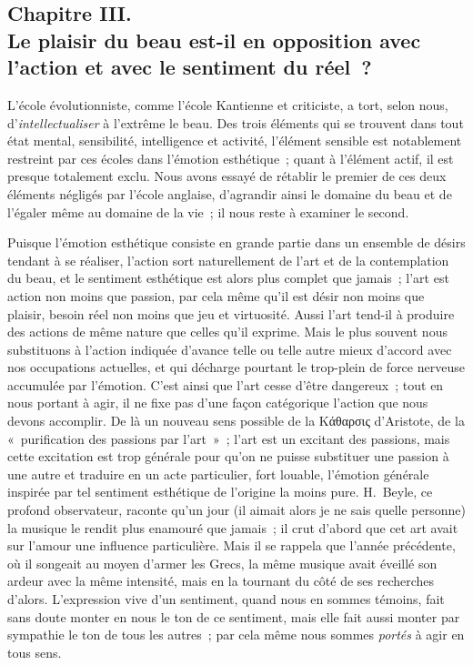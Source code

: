 \documentclass[french,twoside]{book} %
\begin{document}
\subsection[{Chapitre III. Le plaisir du beau est-il en opposition avec l’action et avec le sentiment du réel ?}]{Chapitre III. \\
Le plaisir du beau est-il en opposition avec l’action et avec le sentiment du réel ?}
\noindent  L’école évolutionniste, comme l’école Kantienne et criticiste, a tort, selon nous, d’\emph{intellectualiser} à l’extrême le beau. Des trois éléments qui se trouvent dans tout état mental, sensibilité, intelligence et activité, l’élément sensible est notablement restreint par ces écoles dans l’émotion esthétique ; quant à l’élément actif, il est presque totalement exclu. Nous avons essayé de rétablir le premier de ces deux éléments négligés par l’école anglaise, d’agrandir ainsi le domaine du beau et de l’égaler même au domaine de la vie ; il nous reste à examiner le second.\par
Puisque l’émotion esthétique consiste en grande partie dans un ensemble de désirs tendant à se réaliser, l’action sort naturellement de l’art et de la contemplation du beau, et le sentiment esthétique est alors plus complet que jamais ; l’art est action non moins que passion, par cela même qu’il est désir non moins que plaisir, besoin réel  non moins que jeu et virtuosité. Aussi l’art tend-il à produire des actions de même nature que celles qu’il exprime. Mais le plus souvent nous substituons à l’action indiquée d’avance telle ou telle autre mieux d’accord avec nos occupations actuelles, et qui décharge pourtant le trop-plein de force nerveuse accumulée par l’émotion. C’est ainsi que l’art cesse d’être dangereux ; tout en nous portant à agir, il ne fixe pas d’une façon catégorique l’action que nous devons accomplir. De là un nouveau sens possible de la Κάθαρσις d’Aristote, de la « purification des passions par l’art » ; l’art est un excitant des passions, mais cette excitation est trop générale pour qu’on ne puisse substituer une passion à une autre et traduire en un acte particulier, fort louable, l’émotion générale inspirée par tel sentiment esthétique de l’origine la moins pure. H. Beyle, ce profond observateur, raconte qu’un jour (il aimait alors je ne sais quelle personne) la musique le rendit plus enamouré que jamais ; il crut d’abord que cet art avait sur l’amour une influence particulière. Mais il se rappela que l’année précédente, où il songeait au moyen d’armer les Grecs, la même musique avait éveillé son ardeur avec la même intensité, mais en la tournant du côté de ses recherches d’alors. L’expression vive d’un sentiment, quand nous en sommes témoins, fait sans doute monter en nous le ton de ce sentiment, mais elle fait aussi monter par sympathie le ton de tous les autres ; par cela même nous sommes \emph{portés} à agir en tous sens.\par
\end{document}

